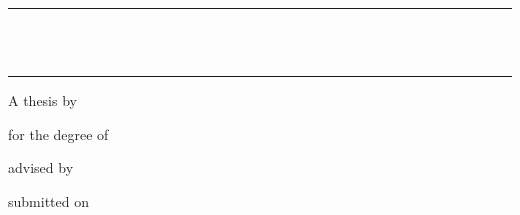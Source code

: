 \begin{titlepage}
  
  \begin{center}
    \begin{minipage}{\textwidth}
      \centering
      \rule{\linewidth}{0.2mm} \\[6mm]
      { \LARGE \bfseries \thesistitle } \\[2mm]
      \rule{\linewidth}{0.2mm}
    \end{minipage}
  \end{center}

  \vspace{16mm}

  \begin{center}
    \begin{minipage}[t]{\textwidth}
      \centering
      {\small A thesis by} \\[2mm]
      {\large \textbf{\thesisauthor}}
    \end{minipage}
  \end{center}

  \vspace{30mm}

  \begin{center}
    \begin{minipage}[t]{\textwidth}
      \centering
      {\small for the degree of} \\[1mm]
      {\large \thesisdegree}
    \end{minipage}
  \end{center}
  
  \vspace{2mm}
  
  \begin{center}
    \begin{minipage}[t]{\textwidth}
      \centering
      {\small advised by} \\[1mm]
      \thesisadvisor
    \end{minipage}
  \end{center}

  \vspace{2mm}

  \begin{center}
    \begin{minipage}[t]{\textwidth}
      \centering
      {\small submitted on} \\[1mm]
      \thesisdate
    \end{minipage}
  \end{center}


\end{titlepage}
